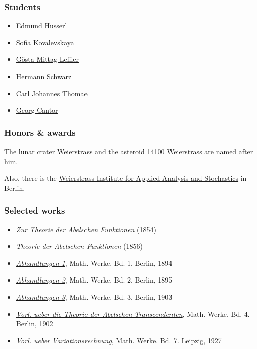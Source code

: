 \documentclass{article}
\begin{document}
\subsubsection{Students}
\begin{itemize}
	\item \href{https://en.wikipedia.org/wiki/Edmund_Husserl}{Edmund Husserl}
	\item \href{https://en.wikipedia.org/wiki/Sofia_Kovalevskaya}{Sofia Kovalevskaya}
	\item \href{https://en.wikipedia.org/wiki/G%C3%B6sta_Mittag-Leffler}{Gösta Mittag-Leffler}
	\item \href{https://en.wikipedia.org/wiki/Hermann_Schwarz}{Hermann Schwarz}
	\item \href{https://en.wikipedia.org/wiki/Carl_Johannes_Thomae}{Carl Johannes Thomae}
	\item \href{https://en.wikipedia.org/wiki/Georg_Cantor}{Georg Cantor}
\end{itemize}

\subsubsection{Honors \& awards}
The lunar \href{https://en.wikipedia.org/wiki/Impact_crater}{crater} \href{https://en.wikipedia.org/wiki/Weierstrass_(crater)}{Weierstrass} and the \href{https://en.wikipedia.org/wiki/Asteroid}{asteroid} \href{https://en.wikipedia.org/wiki/14100_Weierstrass}{14100 Weierstrass} are named after him.

Also, there is the \href{https://en.wikipedia.org/wiki/Weierstrass_Institute_for_Applied_Analysis_and_Stochastics}{Weierstrass Institute for Applied Analysis and Stochastics} in Berlin.

\subsubsection{Selected works}
\begin{itemize}
	\item \textit{Zur Theorie der Abelschen Funktionen} (1854)
	\item \textit{Theorie der Abelschen Funktionen} (1856)
	\item \href{http://name.umdl.umich.edu/AAN8481.0001.001}{\textit{Abhandlungen-1}}, Math. Werke. Bd. 1. Berlin, 1894
	\item \href{http://name.umdl.umich.edu/AAN8481.0002.001}{\textit{Abhandlungen-2}}, Math. Werke. Bd. 2. Berlin, 1895
	\item \href{http://name.umdl.umich.edu/AAN8481.0003.001}{\textit{Abhandlungen-3}}, Math. Werke. Bd. 3. Berlin, 1903
	\item \href{http://name.umdl.umich.edu/AAN8481.0004.001}{\textit{Vorl. ueber die Theorie der Abelschen Transcendenten}}, Math. Werke. Bd. 4. Berlin, 1902
	\item \href{http://name.umdl.umich.edu/AAN8481.0007.001}{\textit{Vorl. ueber Variationsrechnung}}, Math. Werke. Bd. 7. Leipzig, 1927
\end{itemize}
\end{document}
